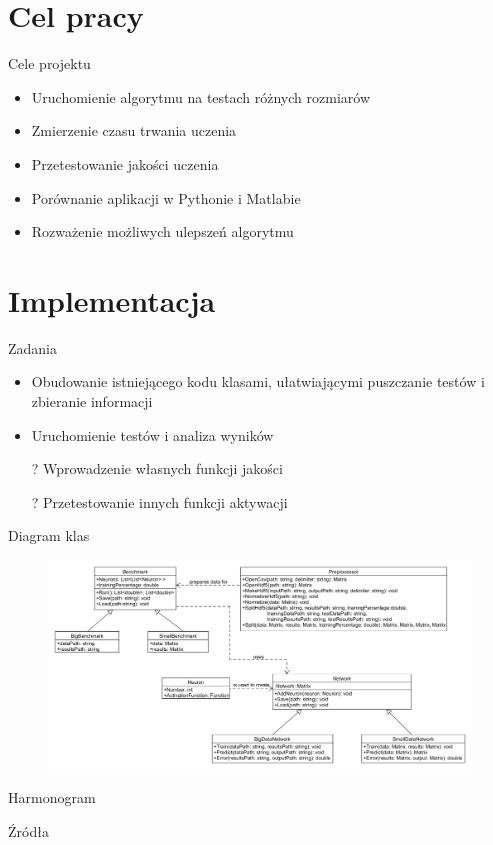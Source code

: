 \documentclass{beamer}
\begin{document}
\section{Cel pracy}
\begin{frame}{Cele projektu}
\begin{itemize}
\item Uruchomienie algorytmu na testach różnych rozmiarów
\item Zmierzenie czasu trwania uczenia
\item Przetestowanie jakości uczenia
\item Porównanie aplikacji w Pythonie i Matlabie
\item Rozważenie możliwych ulepszeń algorytmu
\end{itemize}
\end{frame}
\section{Implementacja}
\begin{frame}{Zadania}
\begin{itemize}
\item Obudowanie istniejącego kodu klasami, ułatwiającymi puszczanie testów i zbieranie informacji
\item Uruchomienie testów i analiza wyników
\item[?] Wprowadzenie własnych funkcji jakości 
\item[?] Przetestowanie innych funkcji aktywacji
\end{itemize}
\end{frame}

\begin{frame}{Diagram klas}
\begin{figure}
	\includegraphics[scale=0.26]{classes.png}
\end{figure}
\end{frame}


\begin{frame}{Harmonogram}

\end{frame}


\begin{frame}{Źródła}

\end{frame}
\end{document}
